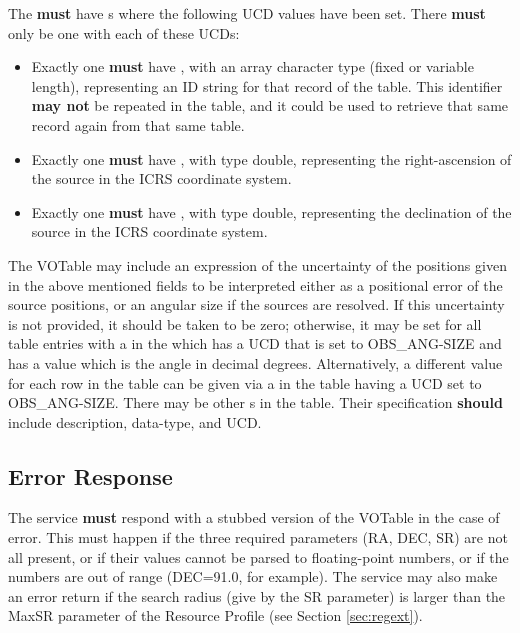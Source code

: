 \documentclass[11pt,a4paper]{ivoa}
\begin{document}
The  \textbf{must} have s where the following UCD values have been set. There \textbf{must} only be one  with each of these UCDs:
\begin{itemize}
	\item Exactly one  \textbf{must} have , with an array character type (fixed or variable length), representing an ID string for that record of the table. This identifier \textbf{may not} be repeated in the table, and it could be used to retrieve that same record again from that same table.
	\item Exactly one  \textbf{must} have , with type double, representing the right-ascension of the source in the ICRS coordinate system.
	\item Exactly one  \textbf{must} have , with type double, representing the declination of the source in the ICRS coordinate system.
\end{itemize}
The VOTable may include an expression of the uncertainty of the positions given in the above mentioned fields to be interpreted either as a positional error of the source positions, or an angular size if the sources are resolved. If this uncertainty is not provided, it should be taken to be zero; otherwise, it may be set for all table entries with a  in the  which has a UCD that is set to OBS\_ANG-SIZE and has a value which is the angle in decimal degrees. Alternatively, a different value for each row in the table can be given via a  in the table having a UCD set to OBS\_ANG-SIZE.
There may be other s in the table. Their specification \textbf{should} include description, data-type, and UCD.

\subsection{Error Response}
\label{sec:error}
The service \textbf{must} respond with a stubbed version of the VOTable in the case of error. This must happen if the three required parameters (RA, DEC, SR) are not all present, or if their values cannot be parsed to floating-point numbers, or if the numbers are out of range (DEC=91.0, for example). The service may also make an error return if the search radius (give by the SR parameter) is larger than the MaxSR parameter of the Resource Profile (see Section \ref{sec:regext}).
\end{document}
